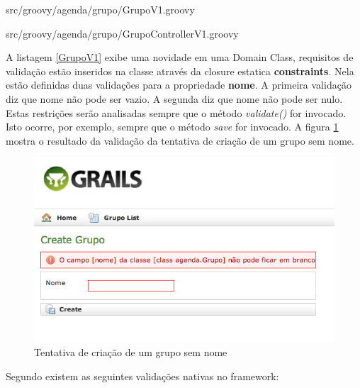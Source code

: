 \documentclass[12pt]{article}
\begin{document}
  
  
                  {src/groovy/agenda/grupo/GrupoV1.groovy}
 
  
                  {src/groovy/agenda/grupo/GrupoControllerV1.groovy}
 
  A listagem \ref{GrupoV1} exibe uma novidade em uma Domain Class, requisitos de 
  validação estão inseridos na classe através da closure estatica \textbf{constraints}.
  Nela estão definidas duas validações para a propriedade \textbf{nome}. A primeira
  validação diz que nome não pode ser vazio. A segunda diz que nome não pode ser
  nulo. Estas restrições serão analisadas sempre que o método \emph{validate()} 
  for invocado. Isto ocorre, por exemplo, sempre que o método \emph{save} for 
  invocado. A figura \ref{fig:ValidacaoGrupo} mostra o resultado da validação da 
  tentativa de criação de um grupo sem nome.
  
  \begin{figure}[h!]
       \centering
       \includegraphics[width=.4\textwidth]{images/validacaoGrupo.png}
       \caption{Tentativa de criação de um grupo sem nome}
       \label{fig:ValidacaoGrupo}
   \end{figure} 
  
  Segundo \cite{pragmaticGrails:2009} existem as seguintes validações nativas no
  framework:
  
\end{document}
